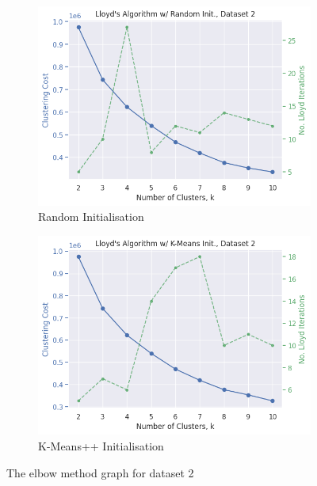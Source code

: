 \documentclass[12pt]{article}
\begin{document}
\begin{figure}[ht]
    \centering
    \begin{subfigure}{0.5\textwidth}
      \centering
      \includegraphics[width=\linewidth]{8.png}
      \caption{Random Initialisation}
      \label{fig:8}
    \end{subfigure}%
    \hfill
    \begin{subfigure}{0.5\textwidth}
      \centering
      \includegraphics[width=\linewidth]{15.png}
      \caption{K-Means++ Initialisation}
      \label{fig:15}
    \end{subfigure}%
    \caption{The elbow method graph for dataset 2}
    \label{fig:elbow_2}
\end{figure}
\end{document}
